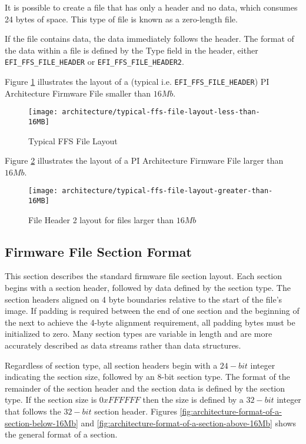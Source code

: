 It is possible to create a file that has only a header and no data, which consumes 24 bytes of space.
This type of file is known as a zero-length file.

If the file contains data, the data immediately follows the header. The format of the data within a file
is defined by the Type field in the header, either \verb|EFI_FFS_FILE_HEADER| or \verb|EFI_FFS_FILE_HEADER2|.

Figure \ref{fig:architecture-typical-ffs-file-layout-less-than-16MB} illustrates the layout of a (typical i.e. \verb|EFI_FFS_FILE_HEADER|) PI Architecture Firmware File smaller than $ 16 Mb $.

\begin{figure}[!htbp]
	\centering
	\texttt{[image: architecture/typical-ffs-file-layout-less-than-16MB]}
	\caption{Typical FFS File Layout}\label{fig:architecture-typical-ffs-file-layout-less-than-16MB}
\end{figure}

Figure \ref{fig:architecture-typical-ffs-file-layout-greater-than-16MB} illustrates the layout of a PI Architecture Firmware File larger than $ 16 Mb $.

\begin{figure}[!htbp]
	\centering
	\texttt{[image: architecture/typical-ffs-file-layout-greater-than-16MB]}
	\caption{File Header 2 layout for files larger than $ 16Mb $}\label{fig:architecture-typical-ffs-file-layout-greater-than-16MB}
\end{figure}


\subsection{Firmware File Section Format}
This section describes the standard firmware file section layout.
Each section begins with a section header, followed by data defined by the section type.
The section headers aligned on 4 byte boundaries relative to the start of the file's image. If padding is
required between the end of one section and the beginning of the next to achieve the 4-byte
alignment requirement, all padding bytes must be initialized to zero.
Many section types are variable in length and are more accurately described as data streams rather
than data structures.

Regardless of section type, all section headers begin with a $ 24-bit $ integer indicating the section size,
followed by an 8-bit section type. The format of the remainder of the section header and the section
data is defined by the section type. If the section size is $ 0xFFFFFF $ then the size is defined by a $ 32-
bit $ integer that follows the $ 32-bit $ section header. Figures \ref{fig:architecture-format-of-a-section-below-16Mb} and \ref{fig:architecture-format-of-a-section-above-16Mb} shows the general format of a section.

